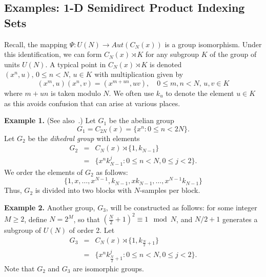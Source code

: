 \documentclass[reqno,onecolumn,oneside]{paper}
\newcommand{\<}{\ensuremath{\langle}}
\renewcommand{\>}{\ensuremath{\rangle}}
\newcommand{\sdp}{\ensuremath{\rtimes}}
\newcommand{\vs}[1]{\ensuremath{\mathcal{#1}}}
\begin{document}
\subsection{Examples: 1-D Semidirect Product Indexing Sets}
Recall, the mapping $\Psi: U(N) \to Aut(C_N(x))$ is a group
isomorphism.
Under this identification, we can form $C_N(x)\sdp K$
for any subgroup $K$ of the group of units $U(N)$.  
A typical point in $C_N(x)\sdp K$ is denoted 
$(x^n, u), \, 0\leq n<N,\, u\in K$ with multiplication given
by  
\[
(x^m, u)(x^n, v) = (x^{m+un},uv), \quad 
0\leq m, n < N,\, u, v \in K
\]
where $m+un$ is taken modulo $N$.
We often use $k_u$ to denote the element $u\in K$ as this
avoids confusion that can arise at various places.

\begin{example}
\label{ex:g2}
{\bf Example 1.} 
(See also~\cite[page 125]{An:2003}.)
Let $G_1$ be the abelian group 
\begin{equation}
G_1 = C_{2N}(x) = \{x^n : 0 \leq n < 2N\}. %
\end{equation}
Let $G_2$ be the \emph{dihedral group} %
with elements
\begin{eqnarray*}
G_2&=& C_N(x) \sdp \{1, k_{N-1}\}\\
&=& \{x^n k_{N-1}^j : 0 \leq n < N, 0 \leq j < 2\}.
\end{eqnarray*}
We order the elements of $G_2$ as follows:
\[
\{1, x, \ldots, x^{N-1}, k_{N-1}, xk_{N-1}, \ldots, x^{N-1}
k_{N-1}\}
\]
Thus, $G_2$ is divided into two blocks with $N$-samples per block.
\end{example}

\begin{example}
\label{ex:g3}
{\bf Example 2.} 
Another group, $G_3$, will be constructed as follows: for some 
integer $M \geq 2$, define $N= 2^M$, so that
$\left(\frac{N}{2} + 1\right)^2 \equiv 1 \mod N$,
and $N/2 + 1$ generates a subgroup of $U(N)$ of order 2.
Let 
\begin{eqnarray*}
G_3 &=& C_N(x) \sdp \{1, k_{\frac{N}{2} + 1}\}\\
& =& \{x^n k_{\frac{N}{2}+1}^j : 0 \leq n < N, 0 \leq j < 2\}.
\end{eqnarray*}
Note that $G_2$ and $G_3$ are isomorphic groups.
\end{example}
\end{document}
